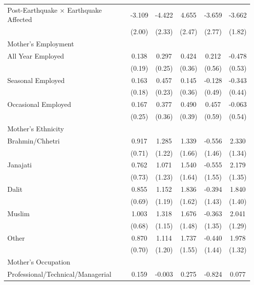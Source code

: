 \begin{longtable}{l*{5}{c}}
Post-Earthquake × Earthquake Affected & -3.109 & -4.422\sym{*} & 4.655\sym{*} & -3.659 & -3.662\sym{**} \\
                    & (2.00) & (2.33) & (2.47) & (2.77) & (1.82) \\
\multicolumn{6}{l}{Mother's Employment} \\
\hspace{1em}All Year Employed & 0.138 & 0.297 & 0.424 & 0.212 & -0.478 \\
                    & (0.19) & (0.25) & (0.36) & (0.56) & (0.53) \\
\hspace{1em}Seasonal Employed & 0.163 & 0.457\sym{*} & 0.145 & -0.128 & -0.343 \\
                    & (0.18) & (0.23) & (0.36) & (0.49) & (0.44) \\
\hspace{1em}Occasional Employed & 0.167 & 0.377 & 0.490 & 0.457 & -0.063 \\
                    & (0.25) & (0.36) & (0.39) & (0.59) & (0.54) \\
\multicolumn{6}{l}{Mother's Ethnicity} \\
\hspace{1em}Brahmin/Chhetri & 0.917 & 1.285 & 1.339 & -0.556 & 2.330\sym{*} \\
                    & (0.71) & (1.22) & (1.66) & (1.46) & (1.34) \\
\hspace{1em}Janajati & 0.762 & 1.071 & 1.540 & -0.555 & 2.179 \\
                    & (0.73) & (1.23) & (1.64) & (1.55) & (1.35) \\
\hspace{1em}Dalit & 0.855 & 1.152 & 1.836 & -0.394 & 1.840 \\
                    & (0.69) & (1.19) & (1.62) & (1.43) & (1.40) \\
\hspace{1em}Muslim & 1.003 & 1.318 & 1.676 & -0.363 & 2.041 \\
                    & (0.68) & (1.15) & (1.48) & (1.35) & (1.29) \\
\hspace{1em}Other & 0.870 & 1.114 & 1.737 & -0.440 & 1.978 \\
                    & (0.70) & (1.20) & (1.55) & (1.44) & (1.32) \\
\multicolumn{6}{l}{Mother's Occupation} \\
\hspace{1em}Professional/Technical/Managerial & 0.159 & -0.003 & 0.275 & -0.824 & 0.077 \\

\end{longtable}

